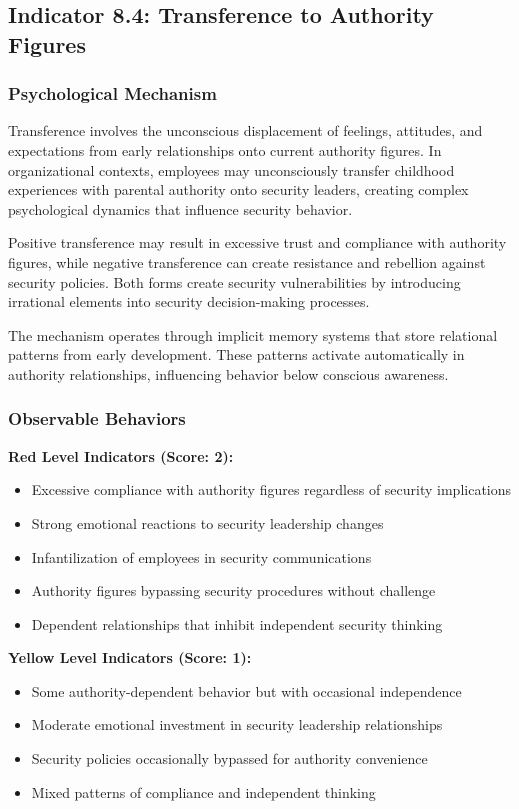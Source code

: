 \documentclass[11pt,a4paper]{article}
\begin{document}
\subsection{Indicator 8.4: Transference to Authority Figures}

\subsubsection{Psychological Mechanism}

Transference involves the unconscious displacement of feelings, attitudes, and expectations from early relationships onto current authority figures. In organizational contexts, employees may unconsciously transfer childhood experiences with parental authority onto security leaders, creating complex psychological dynamics that influence security behavior\cite{kernberg1998}.

Positive transference may result in excessive trust and compliance with authority figures, while negative transference can create resistance and rebellion against security policies. Both forms create security vulnerabilities by introducing irrational elements into security decision-making processes.

The mechanism operates through implicit memory systems that store relational patterns from early development. These patterns activate automatically in authority relationships, influencing behavior below conscious awareness\cite{schacter1996}.

\subsubsection{Observable Behaviors}

\textbf{Red Level Indicators (Score: 2):}
\begin{itemize}
\item Excessive compliance with authority figures regardless of security implications
\item Strong emotional reactions to security leadership changes
\item Infantilization of employees in security communications
\item Authority figures bypassing security procedures without challenge
\item Dependent relationships that inhibit independent security thinking
\end{itemize}

\textbf{Yellow Level Indicators (Score: 1):}
\begin{itemize}
\item Some authority-dependent behavior but with occasional independence
\item Moderate emotional investment in security leadership relationships
\item Security policies occasionally bypassed for authority convenience
\item Mixed patterns of compliance and independent thinking
\end{itemize}
\end{document}
